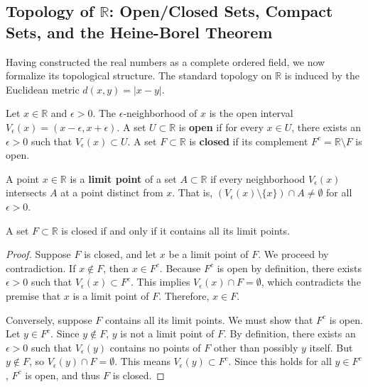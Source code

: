 \subsection{Topology of $\mathbb{R}$: Open/Closed Sets, Compact Sets, and the Heine-Borel Theorem}

Having constructed the real numbers as a complete ordered field, we now formalize its topological structure. The standard topology on $\mathbb{R}$ is induced by the Euclidean metric $d(x, y) = |x - y|$.

\begin{definition}
Let $x \in \mathbb{R}$ and $\epsilon > 0$. The $\epsilon$-neighborhood of $x$ is the open interval $V_\epsilon(x) = (x - \epsilon, x + \epsilon)$. A set $U \subset \mathbb{R}$ is \textbf{open} if for every $x \in U$, there exists an $\epsilon > 0$ such that $V_\epsilon(x) \subset U$. A set $F \subset \mathbb{R}$ is \textbf{closed} if its complement $F^c = \mathbb{R} \setminus F$ is open.
\end{definition}

\begin{definition}
A point $x \in \mathbb{R}$ is a \textbf{limit point} of a set $A \subset \mathbb{R}$ if every neighborhood $V_\epsilon(x)$ intersects $A$ at a point distinct from $x$. That is, $(V_\epsilon(x) \setminus \{x\}) \cap A \neq \emptyset$ for all $\epsilon > 0$.
\end{definition}

\begin{theorem}
A set $F \subset \mathbb{R}$ is closed if and only if it contains all its limit points.
\end{theorem}

\begin{proof}
Suppose $F$ is closed, and let $x$ be a limit point of $F$. We proceed by contradiction. If $x \notin F$, then $x \in F^c$. Because $F^c$ is open by definition, there exists $\epsilon > 0$ such that $V_\epsilon(x) \subset F^c$. This implies $V_\epsilon(x) \cap F = \emptyset$, which contradicts the premise that $x$ is a limit point of $F$. Therefore, $x \in F$.

Conversely, suppose $F$ contains all its limit points. We must show that $F^c$ is open. Let $y \in F^c$. Since $y \notin F$, $y$ is not a limit point of $F$. By definition, there exists an $\epsilon > 0$ such that $V_\epsilon(y)$ contains no points of $F$ other than possibly $y$ itself. But $y \notin F$, so $V_\epsilon(y) \cap F = \emptyset$. This means $V_\epsilon(y) \subset F^c$. Since this holds for all $y \in F^c$, $F^c$ is open, and thus $F$ is closed.
\end{proof}

